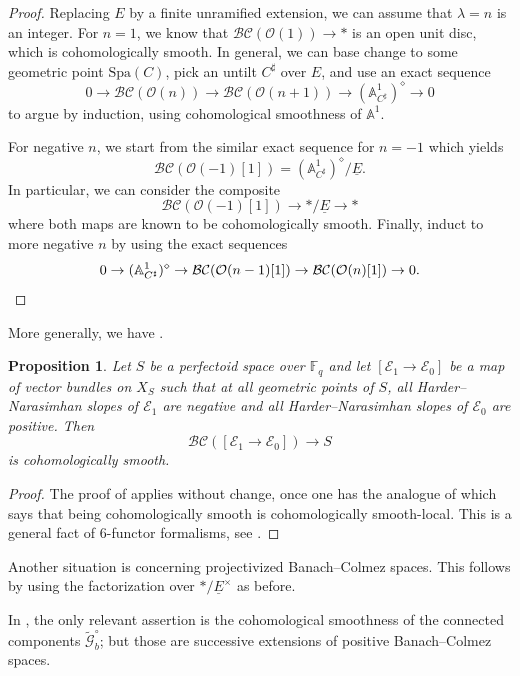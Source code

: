 \documentclass[11pt]{amsart}
\numberwithin{equation}{section}
\numberwithin{theorem}{section}
\newtheorem{proposition}[theorem]{Proposition}
\theoremstyle{definition}
\newcommand{\BC}{\mathcal{BC}}
\newcommand{\Spa}{\mathrm{Spa}}
\begin{document}
\begin{proof} Replacing $E$ by a finite unramified extension, we can assume that $\lambda=n$ is an integer. For $n=1$, we know that $\BC(\mathcal O(1))\to \ast$ is an open unit disc, which is cohomologically smooth. In general, we can base change to some geometric point $\Spa(C)$, pick an untilt $C^\sharp$ over $E$, and use an exact sequence
\[
0\to \BC(\mathcal O(n))\to \BC(\mathcal O(n+1))\to (\mathbb A^1_{C^\sharp})^\diamond\to 0
\]
to argue by induction, using cohomological smoothness of $\mathbb A^1$.

For negative $n$, we start from the similar exact sequence for $n=-1$ which yields
\[
\BC(\mathcal O(-1)[1]) = (\mathbb A^1_{C^\sharp})^\diamond/\underline{E}.
\]
In particular, we can consider the composite
\[
\BC(\mathcal O(-1)[1])\to \ast/\underline{E}\to \ast
\]
where both maps are known to be cohomologically smooth. Finally, induct to more negative $n$ by using the exact sequences
\[
0\to (\mathbb A^1_{C^\sharp})^\diamond\to \BC(\mathcal O(n-1)[1])\to \BC(\mathcal O(n)[1])\to 0.\qedhere
\]
\end{proof}

More generally, we have \cite[Proposition II.3.5]{FarguesScholze}.

\begin{proposition}\label{prop:BCsmoothgeneral} Let $S$ be a perfectoid space over $\mathbb F_q$ and let $[\mathcal E_1\to \mathcal E_0]$ be a map of vector bundles on $X_S$ such that at all geometric points of $S$, all Harder--Narasimhan slopes of $\mathcal E_1$ are negative and all Harder--Narasimhan slopes of $\mathcal E_0$ are positive. Then
\[
\BC([\mathcal E_1\to \mathcal E_0])\to S
\]
is cohomologically smooth.
\end{proposition}

\begin{proof} The proof of \cite[Proposition II.3.5 (iii)]{FarguesScholze} applies without change, once one has the analogue of \cite[Proposition 23.13]{ECoD} which says that being cohomologically smooth is cohomologically smooth-local. This is a general fact of $6$-functor formalisms, see \cite[Lemma 4.5.8 (i)]{HeyerMann}.
\end{proof}

Another situation is \cite[Proposition II.3.7]{FarguesScholze} concerning projectivized Banach--Colmez spaces. This follows by using the factorization over $\ast/\underline{E}^\times$ as before.

In \cite[Chapter III]{FarguesScholze}, the only relevant assertion is the cohomological smoothness of the connected components $\tilde{\mathcal G}_b^\circ$; but those are successive extensions of positive Banach--Colmez spaces.
\end{document}
